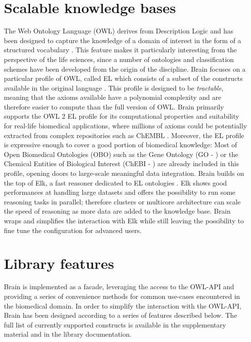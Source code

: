 \documentclass{bioinfo}
\begin{document}
\section{Scalable knowledge bases}
The Web Ontology Language (OWL) derives from Description Logic and
has been designed to capture the knowledge of a domain of interest in the form of a structured vocabulary \citep{W3COWLWorkingGroup}.
This feature makes it particularly
interesting from the perspective of the life sciences, since a number of ontologies and classification schemes
have been developed from the origin of
the discipline. Brain focuses on a particular profile of OWL, called EL
which consists of a subset of the constructs available in the original language \citep{Motik2009}. This profile is
designed to be \emph{tractable}, meaning that the axioms available have a polynomial complexity
and are therefore easier to compute than the full version of OWL.
Brain primarily supports the OWL 2 EL profile for its computational properties and suitability for real-life biomedical applications,
where millions of axioms could be potentially extracted from complex repositories such as ChEMBL \citep{Gaulton2012}.
Moreover, the EL profile is expressive enough to cover a good portion of biomedical knowledge: Most of Open Biomedical Ontologies (OBO)
such as the Gene Ontology (GO - \citealp{Ashburner2000}) or
the Chemical Entities of Biological Interest (ChEBI - \citealp{DeMatos2010}) are already included in this
profile, opening doors to large-scale meaningful data integration.
Brain builds on the top of Elk, a fast reasoner dedicated to EL ontologies \citep{YevgenyKazakov2011}. Elk shows good
performances at handling
large datasets and offers the possibility to run some reasoning tasks in parallel; therefore
clusters or multicore architecture can scale the speed of reasoning as more data are added to the knowledge base.
Brain wraps and simplifies the interaction with Elk while still leaving the possibility to fine tune
the configuration for advanced users.

\section{Library features}
Brain is implemented as a facade, leveraging the access to the OWL-API and providing a series of convenience methods for common
use-cases encountered in the biomedical domain. In order to simplify the interaction with the OWL-API, Brain has been designed according to
a series of features described below. The full list of currently supported constructs is available in the supplementary material and in
the library documentation.
\end{document}
